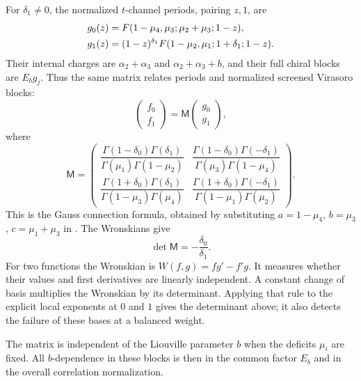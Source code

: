 For $\delta_1\ne0$, the normalized $t$-channel periods, pairing
$z,1$, are
\begin{align}
 g_0(z)&=F(1-\mu_4,\mu_3;\mu_2+\mu_3;1-z),\notag\\
 g_1(z)&=(1-z)^{\delta_1}
        F(1-\mu_2,\mu_1;1+\delta_1;1-z).
 \label{eq:screeningtbasis}
\end{align}
Their internal charges are $\alpha_2+\alpha_3$ and
$\alpha_2+\alpha_3+b$, and their full chiral blocks are
$E_b g_j$. Thus the same matrix relates periods and normalized
screened Virasoro blocks:
\begin{equation}
 \begin{pmatrix}f_0\\f_1\end{pmatrix}
  =\mathsf M\begin{pmatrix}g_0\\g_1\end{pmatrix},
 \label{eq:screeningfusionrelation}
\end{equation}
where
\begin{equation}
 \boxed{\quad
 \mathsf M=\begin{pmatrix}
 \dfrac{\Gamma(1-\delta_0)\Gamma(\delta_1)}
       {\Gamma(\mu_1)\Gamma(1-\mu_2)}
 &\dfrac{\Gamma(1-\delta_0)\Gamma(-\delta_1)}
       {\Gamma(\mu_3)\Gamma(1-\mu_4)}\\[10pt]
 \dfrac{\Gamma(1+\delta_0)\Gamma(\delta_1)}
       {\Gamma(1-\mu_3)\Gamma(\mu_4)}
 &\dfrac{\Gamma(1+\delta_0)\Gamma(-\delta_1)}
       {\Gamma(1-\mu_1)\Gamma(\mu_2)}
 \end{pmatrix}.
 \quad}
 \label{eq:screeningfusionmatrix}
\end{equation}
This is the Gauss connection formula, obtained by substituting
$a=1-\mu_4$, $b=\mu_3$, $c=\mu_1+\mu_3$ in
\cite[eqs.~15.10.21--22]{DLMF}. The Wronskians give
\begin{equation}
 \det\mathsf M=-\frac{\delta_0}{\delta_1}.
 \label{eq:fusiondeterminant}
\end{equation}
For two functions the Wronskian is
$W(f,g)=fg'-f'g$. It measures whether their values and first
derivatives are linearly independent. A constant change of basis
multiplies the Wronskian by its determinant. Applying that rule
to the explicit local exponents at $0$ and $1$ gives the determinant
above; it also detects the failure of these bases at a balanced weight.

The matrix is independent of the Liouville parameter $b$ when
the deficits $\mu_i$ are fixed. All $b$-dependence in these
blocks is then in the common factor $E_b$ and in the overall
correlation normalization.

